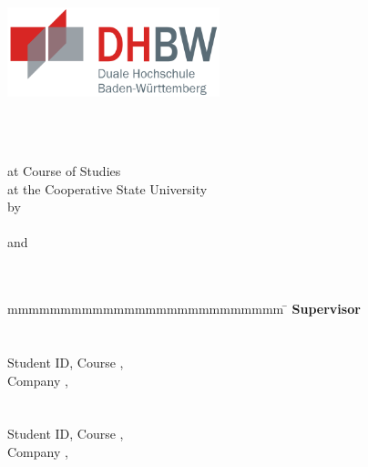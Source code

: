 \begin{titlepage}
	\begin{center}
		\includegraphics[height=2.6cm]{images/dhbw.png}
	\end{center}
	\enlargethispage{20mm}
	\begin{center}
	  \begin{spacing}{2}
	  \vspace*{9mm}	{\Large\bf \titel }\\
	  \end{spacing}
	  \vspace*{8mm}	{\large\bf \arbeit}\\

	  \vspace*{17mm}	at Course of Studies \studiengang\\
	  \vspace*{3mm} 	at the Cooperative State University \dhbw\\
	  \vspace*{12mm}	by\\
	  \vspace*{3mm} 	{\large\bf \autorA}\\
	  \vspace*{3mm} 	{and}\\
	  \vspace*{3mm} 	{\large\bf \autorB}\\
	  \vspace*{12mm}	\datumAbgabe\\
	\end{center}
	\vfill
	\begin{spacing}{1.2}
	\begin{tabbing}
		mmmmmmmmmmmmmmmmmmmmmmmmmm     \= \kill
		\textbf{Supervisor}              \>  \betreuer\\
		\\
		\textbf{\autorA}\\
		Student ID, Course  \>  \matrikelnrA, \kurs\\
		Company      \>  \firmaA, \firmenortA\\
		\\
		\textbf{\autorB}\\
		Student ID, Course  \>  \matrikelnrB, \kurs\\
		Company      \>  \firmaB, \firmenortB\\
		
		
	\end{tabbing}
	\end{spacing}
\end{titlepage}
